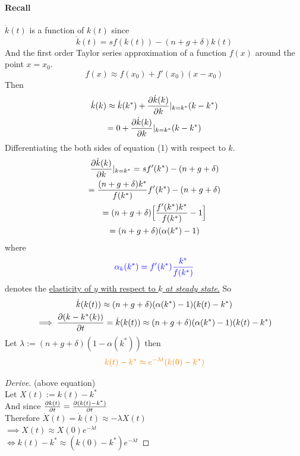 \documentclass[11pt]{article}
\begin{document}
	    \paragraph{Recall} $\dot{k}(t)$ is a function of $k(t)$ since 
	    \begin{equation}
	        \dot{k}(t) = sf(k(t)) - (n+g+\delta)k(t)
	    \end{equation}
	    And the first order Taylor series approximation of a function $f(x)$ around the point $x = x_0$.
	    \[
	        f(x) \approx f(x_0) + f'(x_0)(x - x_0)
	    \]
	    Then
	    \begin{gather*}
	        \dot{k}(k) \approx \dot{k}(k^*) + \frac{\partial{\dot{k}(k)}}{\partial{k}}|_{k=k^*} (k - k^*) \\
	        = 0 + \frac{\partial{\dot{k}(k)}}{\partial{k}}|_{k=k^*} (k - k^*)
	    \end{gather*}
	    Differentiating the both sides of equation (1) with respect to $k$.
	    \begin{gather*}
	        \frac{\partial{\dot{k}(k)}}{\partial{k}}|_{k=k^*} = sf'(k^*) - (n + g + \delta) \\
	        = \frac{(n + g + \delta) k^*}{f(k^*)} f'(k^*) - (n + g + \delta) \\
	        = (n + g + \delta) \Big [
	            \frac{f'(k^*) k^*}{f(k^*)} - 1
	            \Big ] \\
	        = (n + g + \delta) (\alpha (k^*) - 1)
	    \end{gather*}
	    where 
	    \begin{equation}
	    \textcolor{blue}{
	        \alpha_k (k^*) = f'(k^*)\frac{k^*}{f(k^*)}
	        }
	    \end{equation}
	    denotes the \ul{elasticity of $y$ with respect to $k$ \emph{at steady state}.}
	    So
	    \begin{gather*}
	        \dot{k}(k(t)) \approx (n + g + \delta) (\alpha (k^*) - 1) (k(t) - k^*) \\
	        \implies \frac{\partial{({k - k^*}(k))}}{\partial{t}} = \dot{k}(k(t)) \approx (n + g + \delta) (\alpha (k^*) - 1) (k(t) - k^*)
	    \end{gather*}
	    Let $\lambda := (n + g + \delta) (1 - \alpha (k^*))$ then 
	    \begin{gather}
	    \textcolor{orange}{
	        k(t) - k^* \approx e^{-\lambda t}(k(0) - k^*)
	    }
	    \end{gather}
	    \begin{remark}
		    \begin{proof}[Derive] (above equation)\\
		        Let $X(t) := k(t) - k^*$ \\
		        And since $\frac{\partial{k(t)}}{\partial{t}} = \frac{\partial{(k(t) - k^*)}}{\partial{t}}$ \\
		        Therefore $\dot{X}(t) = \dot{k}(t) \approx -\lambda X(t)$ \\
		        $\implies X(t) \approx X(0) e^{-\lambda t}$ \\
		        $\iff k(t) - k^* \approx (k(0) - k^*) e^{-\lambda t}$
		    \end{proof}
	    \end{remark}
\end{document}

